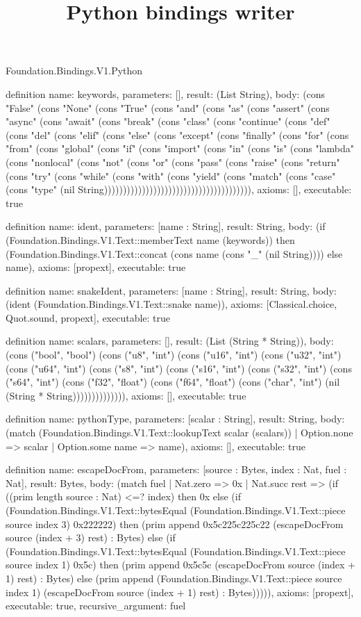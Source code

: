 \begin{lexlean}{Foundation.Bindings.V1.Python}
\title{Python bindings writer}
\begin{semanticmodule}
definition{
  name: keywords,
  parameters: [],
  result: (List String),
  body: (cons "False" (cons "None" (cons "True" (cons "and" (cons "as" (cons "assert" (cons "async" (cons "await" (cons "break" (cons "class" (cons "continue" (cons "def" (cons "del" (cons "elif" (cons "else" (cons "except" (cons "finally" (cons "for" (cons "from" (cons "global" (cons "if" (cons "import" (cons "in" (cons "is" (cons "lambda" (cons "nonlocal" (cons "not" (cons "or" (cons "pass" (cons "raise" (cons "return" (cons "try" (cons "while" (cons "with" (cons "yield" (cons "match" (cons "case" (cons "type" (nil String))))))))))))))))))))))))))))))))))))))),
  axioms: [],
  executable: true
}

definition{
  name: ident,
  parameters: [name : String],
  result: String,
  body: (if (Foundation.Bindings.V1.Text::memberText name (keywords)) then (Foundation.Bindings.V1.Text::concat (cons name (cons "_" (nil String)))) else name),
  axioms: [propext],
  executable: true
}

definition{
  name: snakeIdent,
  parameters: [name : String],
  result: String,
  body: (ident (Foundation.Bindings.V1.Text::snake name)),
  axioms: [Classical.choice, Quot.sound, propext],
  executable: true
}

definition{
  name: scalars,
  parameters: [],
  result: (List (String * String)),
  body: (cons ("bool", "bool") (cons ("u8", "int") (cons ("u16", "int") (cons ("u32", "int") (cons ("u64", "int") (cons ("s8", "int") (cons ("s16", "int") (cons ("s32", "int") (cons ("s64", "int") (cons ("f32", "float") (cons ("f64", "float") (cons ("char", "int") (nil (String * String)))))))))))))),
  axioms: [],
  executable: true
}

definition{
  name: pythonType,
  parameters: [scalar : String],
  result: String,
  body: (match (Foundation.Bindings.V1.Text::lookupText scalar (scalars))
    | Option.none => scalar
    | Option.some name => name),
  axioms: [],
  executable: true
}

definition{
  name: escapeDocFrom,
  parameters: [source : Bytes, index : Nat, fuel : Nat],
  result: Bytes,
  body: (match fuel
    | Nat.zero => 0x
    | Nat.succ rest => (if ((prim length source : Nat) <=? index) then 0x else (if (Foundation.Bindings.V1.Text::bytesEqual (Foundation.Bindings.V1.Text::piece source index 3) 0x222222) then (prim append 0x5c225c225c22 (escapeDocFrom source (index + 3) rest) : Bytes) else (if (Foundation.Bindings.V1.Text::bytesEqual (Foundation.Bindings.V1.Text::piece source index 1) 0x5c) then (prim append 0x5c5c (escapeDocFrom source (index + 1) rest) : Bytes) else (prim append (Foundation.Bindings.V1.Text::piece source index 1) (escapeDocFrom source (index + 1) rest) : Bytes))))),
  axioms: [propext],
  executable: true,
  recursive_argument: fuel
}


\end{semanticmodule}
\end{lexlean}
